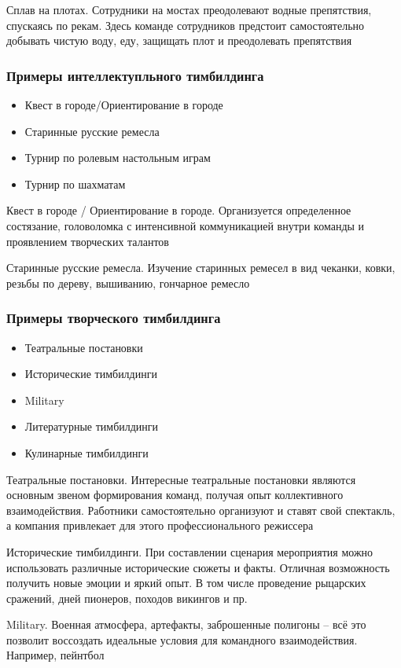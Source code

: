 \documentclass{../industrial-development}
\begin{document}
Сплав на плотах. Сотрудники на мостах преодолевают водные препятствия, спускаясь по рекам. Здесь команде сотрудников предстоит самостоятельно добывать чистую воду, еду, защищать плот и преодолевать препятствия

\begin{frame} \frametitle{Примеры интеллектупльного тимбилдинга}
\begin{itemize}
\item Квест в городе/Ориентирование в городе
\item Старинные русские ремесла
\item Турнир по ролевым настольным играм
\item Турнир по шахматам
\end{itemize}
\end{frame}
\lecturenotes
Квест в городе / Ориентирование в городе. Организуется определенное состязание, головоломка с интенсивной коммуникацией внутри команды и проявлением творческих талантов

Старинные русские ремесла. Изучение старинных ремесел в вид чеканки, ковки, резьбы по дереву, вышиванию, гончарное ремесло

\begin{frame} \frametitle{Примеры творческого тимбилдинга}
\begin{itemize}
\item Театральные постановки
\item Исторические тимбилдинги
\item Military
\item Литературные тимбилдинги
\item Кулинарные тимбилдинги
\end{itemize}
\end{frame}
\lecturenotes
Театральные постановки. Интересные театральные постановки являются основным звеном формирования команд, получая опыт коллективного взаимодействия. Работники самостоятельно организуют и ставят свой спектакль, а компания привлекает для этого профессионального режиссера

Исторические тимбилдинги. При составлении сценария мероприятия можно использовать различные исторические сюжеты и факты. Отличная возможность получить новые эмоции и яркий опыт. В том числе проведение рыцарских сражений, дней пионеров, походов викингов и пр.

Military. Военная атмосфера, артефакты, заброшенные полигоны – всё это позволит воссоздать идеальные условия для командного взаимодействия. Например, пейнтбол
\end{document}
